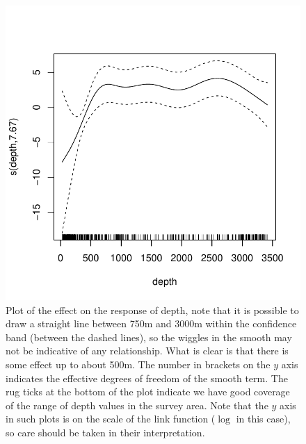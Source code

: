 \documentclass[a4paper,12pt]{article}
\begin{document}
\begin{figure}[h!]
  \caption{Plot of the effect on the response of depth, note that it is possible to draw a straight line between 750m and 3000m within the confidence band (between the dashed lines), so the wiggles in the smooth may not be indicative of any relationship. What is clear is that there is some effect up to about 500m. The number in brackets on the $y$ axis indicates the effective degrees of freedom of the smooth term. The rug ticks at the bottom of the plot indicate we have good coverage of the range of depth values in the survey area. Note that the $y$ axis in such plots is on the scale of the link function ($\log$ in this case), so care should be taken in their interpretation.}
  \label{depth-gamplot}
  \begin{center}
    \includegraphics[width=\textwidth]{figs/fit-depth-gam}
  \end{center}
\end{figure}

\newpage
\end{document}
